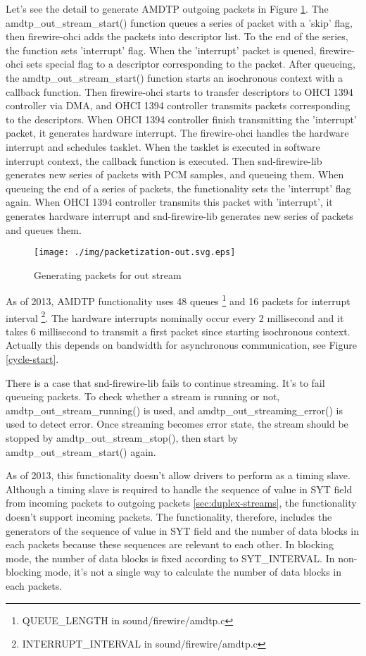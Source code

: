 \documentclass[onecolumn]{article}
\begin{document}
Let's see the detail to generate AMDTP outgoing packets in Figure \ref{fig:packetization-out}. The amdtp\_out\_stream\_start() function queues a series of packet with a 'skip' flag, then firewire-ohci adds the packets into descriptor list. To the end of the series, the function sets 'interrupt' flag. When the 'interrupt' packet is queued, firewire-ohci sets special flag to a descriptor corresponding to the packet. After queueing, the amdtp\_out\_stream\_start() function starts an isochronous context with a callback function. Then firewire-ohci starts to transfer descriptors to OHCI 1394 controller via DMA, and OHCI 1394 controller transmits packets corresponding to the descriptors. When OHCI 1394 controller finish transmitting the 'interrupt' packet, it generates hardware interrupt. The firewire-ohci handles the hardware interrupt and schedules tasklet. When the tasklet is executed in software interrupt context, the callback function is executed. Then snd-firewire-lib generates new series of packets with PCM samples, and queueing them. When queueing the end of a series of packets, the functionality sets the 'interrupt' flag again. When OHCI 1394 controller transmits this packet with 'interrupt', it generates hardware interrupt and snd-firewire-lib generates new series of packets and queues them.

\begin{figure}[H]
	\centering
	\texttt{[image: ./img/packetization-out.svg.eps]}
	\caption{{Generating packets for out stream}}
	\label{fig:packetization-out}
\end{figure}

As of 2013, AMDTP functionality uses 48 queues \footnote{QUEUE\_LENGTH in sound/firewire/amdtp.c} and 16 packets for interrupt interval \footnote{INTERRUPT\_INTERVAL in sound/firewire/amdtp.c}. The hardware interrupts nominally occur every 2 millisecond and it takes 6 millisecond to transmit a first packet since starting isochronous context. Actually this depends on bandwidth for asynchronous communication, see Figure \ref{cycle-start}.

There is a case that snd-firewire-lib fails to continue streaming. It's to fail queueing packets. To check whether a stream is running or not, amdtp\_out\_stream\_running() is used, and amdtp\_out\_streaming\_error() is used to detect error. Once streaming becomes error state, the stream should be stopped by amdtp\_out\_stream\_stop(), then start by amdtp\_out\_stream\_start() again.

As of 2013, this functionality doesn't allow drivers to perform as a timing slave. Although a timing slave is required to handle the sequence of value in SYT field from incoming packets to outgoing packets \ref{sec:duplex-streams}, the functionality doesn't support incoming packets. The functionality, therefore, includes the generators of the sequence of value in SYT field and the number of data blocks in each packets because these sequences are relevant to each other. In blocking mode, the number of data blocks is fixed according to SYT\_INTERVAL. In non-blocking mode, it's not a single way to calculate the number of data blocks in each packets\cite{iec61883-6-1, iec61883-6-2}.
\end{document}
